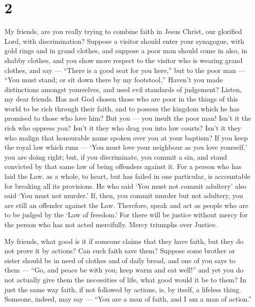 \hypertarget{section-1}{%
\section{2}\label{section-1}}

 My friends, are you really trying to combine faith in Jesus
Christ, our glorified Lord, with discrimination?  Suppose a
visitor should enter your synagogue, with gold rings and in grand
clothes, and suppose a poor man should come in also, in shabby clothes,
 and you show more respect to the visitor who is wearing
grand clothes, and say --- ``There is a good seat for you here,'' but to
the poor man --- ``You must stand; or sit down there by my footstool,''
 Haven't you made distinctions amongst yourselves, and used
evil standards of judgement?  Listen, my dear friends. Has
not God chosen those who are poor in the things of this world to be rich
through their faith, and to possess the kingdom which he has promised to
those who love him?  But you --- you insult the poor man!
Isn't it the rich who oppress you? Isn't it they who drag you into law
courts?  Isn't it they who malign that honourable name
spoken over you at your baptism?  If you keep the royal law
which runs --- `You must love your neighbour as you love yourself,' you
are doing right;  but, if you discriminate, you commit a
sin, and stand convicted by that same law of being offenders against it.
 For a person who has laid the Law, as a whole, to heart,
but has failed in one particular, is accountable for breaking all its
provisions.  He who said `You must not commit adultery'
also said `You must not murder.' If, then, you commit murder but not
adultery, you are still an offender against the Law. 
Therefore, speak and act as people who are to be judged by the `Law of
freedom.'  For there will be justice without mercy for the
person who has not acted mercifully. Mercy triumphs over Justice.

 My friends, what good is it if someone claims that they
have faith, but they do not prove it by actions? Can such faith save
them?  Suppose some brother or sister should be in need of
clothes and of daily bread,  and one of you says to them
--- ``Go, and peace be with you; keep warm and eat well!'' and yet you
do not actually give them the necessities of life, what good would it be
to them?  In just the same way faith, if not followed by
actions, is, by itself, a lifeless thing.  Someone, indeed,
may say --- ``You are a man of faith, and I am a man of action.''

